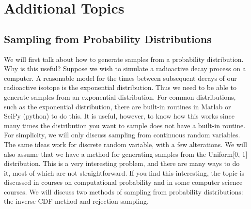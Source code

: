 \documentclass[notes.tex]{subfiles}
\begin{document}
\setcounter{section}{7}
\section{Additional Topics}

\subsection{Sampling from Probability Distributions}
We will first talk about how to generate samples from a probability distribution. Why is this useful? Suppose we wish to simulate a radioactive decay process on a computer. A reasonable model for the times between subsequent decays of our radioactive isotope is the exponential distribution. Thus we need to be able to generate samples from an exponential distribution. For common distributions, such as the exponential distribution, there are built-in routines in Matlab or SciPy (python) to do this. It is useful, however, to know how this works since many times the distribution you want to sample does not have a built-in routine.\\

For simplicity, we will only discuss sampling from continuous random variables. The same ideas work for discrete random variable, with a few alterations. We will also assume that we have a method for generating samples from the Uniform[0, 1] distribution. This is a very interesting problem, and there are many ways to do it, most of which are not straightforward. If you find this interesting, the topic is discussed in courses on computational probability and in some computer science courses. We will discuss two methods of sampling from probability distributions: the inverse CDF method and rejection sampling.\\
\end{document}
